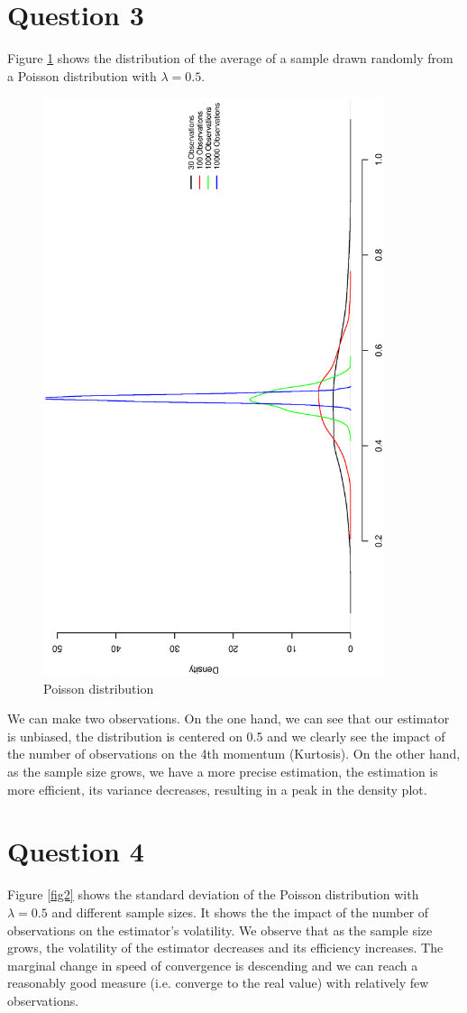 \newpage

\section{Question 3}

Figure \ref{fig1} shows the distribution of the average of a sample drawn randomly from a Poisson distribution with $\lambda=0.5$. 
\begin{figure}[ht]
\centering
\includegraphics[width=10cm, angle=270]{Q1_3plot.eps}
\caption{Poisson distribution}
\label{fig1}
\end{figure}
We can make two observations. On the one hand, we can see that our estimator is unbiased, the distribution is centered on 0.5 and we clearly see the impact of the number of observations on the 4th momentum (Kurtosis). On the other hand, as the sample size grows, we have a more precise estimation, the estimation is more efficient, its variance decreases, resulting in a peak in the density plot.


\section{Question 4}
Figure \ref{fig2} shows the standard deviation of the Poisson distribution with  $\lambda=0.5$ and different sample sizes. It shows the the impact of the number of observations on the estimator's volatility. We observe that as the sample size grows, the volatility of the estimator decreases and its efficiency increases.  The marginal change in speed of convergence is descending and we can reach a reasonably good measure (i.e. converge to the real value) with relatively few observations.

